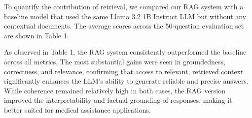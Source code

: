 To quantify the contribution of retrieval, we compared our RAG system with a baseline model that used the same Llama 3.2 1B Instruct LLM but without any contextual documents. The average scores across the 50-question evaluation set are shown in Table 1.

As observed in Table 1, the RAG system consistently outperformed the baseline across all metrics. The most substantial gains were seen in groundedness, correctness, and relevance, confirming that access to relevant, retrieved context significantly enhances the LLM’s ability to generate reliable and precise answers. While coherence remained relatively high in both cases, the RAG version improved the interpretability and factual grounding of responses, making it better suited for medical assistance applications.